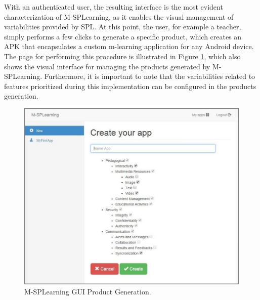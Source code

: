 With an authenticated user, the resulting interface is the most evident characterization of M-SPLearning, as it enables the visual management of variabilities provided by SPL. At this point, the user, for example a teacher, simply performs a few clicks to generate a specific product, which creates an APK that encapsulates a custom m-learning application for any Android device. The page for performing this procedure is illustrated in Figure \ref{figureMSPLWebGeneration}, which also shows the visual interface for managing the products generated by M-SPLearning. Furthermore, it is important to note that the variabilities related to features prioritized during this implementation can be configured in the products generation.


\begin{figure}[!ht]
\centering
\includegraphics[scale=0.45]{figures/section3/MSPLWebGeneration}
\caption{M-SPLearning GUI Product Generation.}
\label{figureMSPLWebGeneration}
\end{figure}

